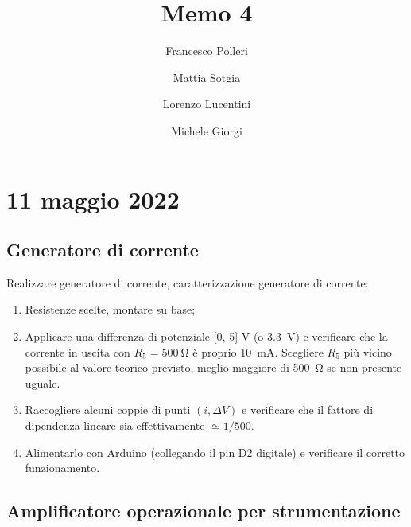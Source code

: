 \documentclass[fleqn,varvw,preprintnumbers,citeautoscript]{memo}
\begin{document}
\title{Memo 4}

\author{Francesco Polleri}
\author{Mattia Sotgia}


\author{Lorenzo Lucentini}
\author{Michele Giorgi}

\revised{\today}

\begin{abstract}

\end{abstract}
\maketitle

\section{11 maggio 2022}

\subsection{Generatore di corrente}

Realizzare generatore di corrente, caratterizzazione generatore di corrente: \begin{enumerate}
    \item Resistenze scelte, montare su base;
    \item Applicare una differenza di potenziale [0, 5] V (o \SI{3.3}{\volt}) e verificare che la corrente in uscita con $R_5 = \SI{500}{\ohm}$ è proprio \SI{10}{\milli\ampere}. Scegliere $R_5$ più vicino possibile al valore teorico previsto, meglio maggiore di \SI{500}{\ohm} se non presente uguale.
    \item Raccogliere alcuni coppie di punti $(i,\Delta V)$ e verificare che il fattore di dipendenza lineare sia effettivamente $\simeq1/500$.
    \item Alimentarlo con Arduino (collegando il pin D2 digitale) e verificare il corretto funzionamento.
\end{enumerate}

\subsection{Amplificatore operazionale per strumentazione}
\end{document}
